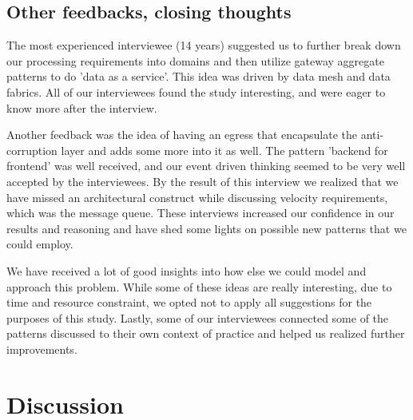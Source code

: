 \documentclass{bmcart}
\begin{document}
\subsection{Other feedbacks, closing thoughts}


The most experienced interviewee (14 years) suggested us to further break down our processing requirements into domains and then utilize gateway aggregate patterns to do 'data as a service'. This idea was driven by data mesh and data fabrics. All of our interviewees found the study interesting, and were eager to know more after the interview. 

Another feedback was the idea of having an egress that encapsulate the anti-corruption layer and adds some more into it as well. The pattern 'backend for frontend' was well received, and our event driven thinking seemed to be very well accepted by the interviewees. By the result of this interview we realized that we have missed an architectural construct while discussing velocity requirements, which was the message queue. These interviews increased our confidence in our results and reasoning and have shed some lights on possible new patterns that we could employ.

We have received a lot of good insights into how else we could model and approach this problem. While some of these ideas are really interesting, due to time and resource constraint, we opted not to apply all suggestions for the purposes of this study. Lastly, some of our interviewees connected some of the patterns discussed to their own context of practice and helped us realized further improvements. 

\section{Discussion}

\end{document}
